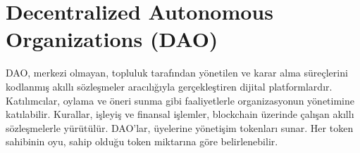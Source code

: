 \section{Decentralized Autonomous Organizations (DAO)}

DAO, merkezi olmayan, topluluk tarafından yönetilen ve karar alma süreçlerini kodlanmış akıllı sözleşmeler aracılığıyla gerçekleştiren dijital platformlardır. Katılımcılar, oylama ve öneri sunma gibi faaliyetlerle organizasyonun yönetimine katılabilir. Kurallar, işleyiş ve finansal işlemler, blockchain üzerinde çalışan akıllı sözleşmelerle yürütülür. DAO'lar, üyelerine yönetişim tokenları sunar.  Her token sahibinin oyu, sahip olduğu token miktarına göre belirlenebilir.

\newpage